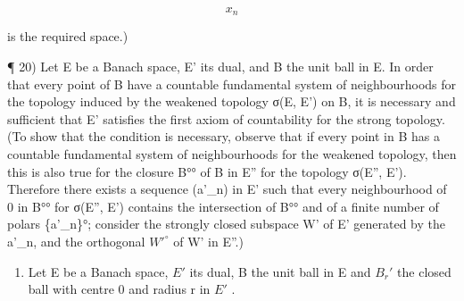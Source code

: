 \[
x _ {n}
\]

is the required space.)

¶ 20) Let E be a Banach space, E' its dual, and B the unit ball in E. In order that every point of B have a countable fundamental system of neighbourhoods for the topology induced by the weakened topology σ(E, E') on B, it is necessary and sufficient that E' satisfies the first axiom of countability for the strong topology. (To show that the condition is necessary, observe that if every point in B has a countable fundamental system of neighbourhoods for the weakened topology, then this is also true for the closure B°° of B in E'' for the topology σ(E'', E'). Therefore there exists a sequence (a'\_n) in E' such that every neighbourhood of 0 in B°° for σ(E'', E') contains the intersection of B°° and of a finite number of polars \{a'\_n\}°; consider the strongly closed subspace W' of E' generated by the a'\_n, and the orthogonal \(W'^{\circ}\) of W' in E''.)

\begin{enumerate}
\def\labelenumi{\arabic{enumi})}
\setcounter{enumi}{20}
\tightlist
\item
  Let E be a Banach space, \(E'\) its dual, B the unit ball in E and \(B_{r}'\) the closed ball with centre 0 and radius r in \(E'\) .
\end{enumerate}

